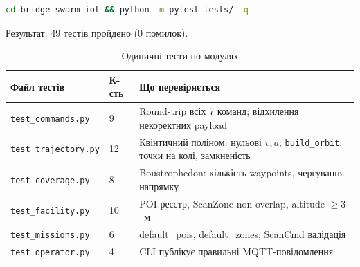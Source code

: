 \begin{lstlisting}[language=bash, caption={Запуск тестів}]
cd bridge-swarm-iot && python -m pytest tests/ -q
\end{lstlisting}

Результат: 49 тестів пройдено (0 помилок).

\begin{table}[h]
  \centering
  \caption{Одиничні тести по модулях}
  \begin{tabularx}{\linewidth}{llX}
    \toprule
    Файл тестів & К-сть & Що перевіряється \\
    \midrule
    \texttt{test\_commands.py}   & 9  & Round-trip всіх 7 команд; відхилення некоректних payload \\
    \texttt{test\_trajectory.py} & 12 & Квінтичний поліном: нульові $v, a$; \texttt{build\_orbit}: точки на колі, замкненість \\
    \texttt{test\_coverage.py}   & 8  & Boustrophedon: кількість waypoints, чергування напрямку \\
    \texttt{test\_facility.py}   & 10 & POI-реєстр, ScanZone non-overlap, altitude $\geq 3$~м \\
    \texttt{test\_missions.py}   & 6  & default\_pois, default\_zones; ScanCmd валідація \\
    \texttt{test\_operator.py}   & 4  & CLI публікує правильні MQTT-повідомлення \\
    \bottomrule
  \end{tabularx}
  \label{tab:tests}
\end{table}
